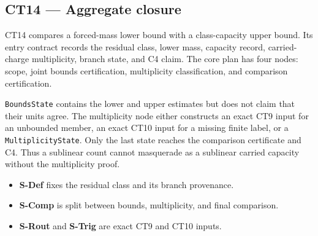 \subsection{CT14 --- Aggregate closure}\label{ct:14}\label{aggregate-closure-mass-bounds-on-residual-classes}

CT14 compares a forced-mass lower bound with a class-capacity upper bound.
Its entry contract records the residual class, lower mass, capacity record,
carried-charge multiplicity, branch state, and C4 claim.  The core plan has
four nodes: scope, joint bounds certification, multiplicity classification,
and comparison certification.

\texttt{BoundsState} contains the lower and upper estimates but does not claim
that their units agree.  The multiplicity node either constructs an exact CT9
input for an unbounded member, an exact CT10 input for a missing finite label,
or a \texttt{MultiplicityState}.  Only the last state reaches the comparison
certificate and C4.  Thus a sublinear count cannot masquerade as a sublinear
carried capacity without the multiplicity proof.

\begin{itemize}
\tightlist
\item \textbf{S-Def} fixes the residual class and its branch provenance.
\item \textbf{S-Comp} is split between bounds, multiplicity, and final comparison.
\item \textbf{S-Rout} and \textbf{S-Trig} are exact CT9 and CT10 inputs.
\end{itemize}

